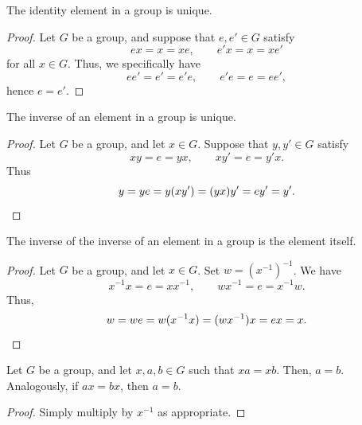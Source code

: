 \documentclass[11pt]{article}
\theoremstyle{definition}
\theoremstyle{remark}
\numberwithin{equation}{section}
\begin{document}
    \begin{lemma}
        The identity element in a group is unique.
    \end{lemma}
    \begin{proof}
        Let $G$ be a group, and suppose that $e, e' \in G$ satisfy \[
            ex = x = xe, \qquad e'x = x = xe'
        \] for all $x \in G$. Thus, we specifically have \[
            ee' = e' = e'e, \qquad e'e = e = ee',
        \] hence $e = e'$.
    \end{proof}

    \begin{lemma}
        The inverse of an element in a group is unique.
    \end{lemma}
    \begin{proof}
        Let $G$ be a group, and let $x \in G$. Suppose that $y, y' \in G$ satisfy \[
            xy = e = yx, \qquad xy' = e = y'x.
        \] Thus \[
            y = ye = y(xy') = (yx)y' = ey' = y'. \qedhere
        \] 
    \end{proof}

    \begin{lemma}
        The inverse of the inverse of an element in a group is the element itself.
    \end{lemma}
    \begin{proof}
        Let $G$ be a group, and let $x \in G$. Set $w = (x^{-1})^{-1}$. We have \[
            x^{-1}x = e = x x^{-1}, \qquad wx^{-1} = e = x^{-1}w.
        \] Thus, \[
            w = we = w(x^{-1}x) = (wx^{-1})x = ex = x. \qedhere
        \] 
    \end{proof}

    \begin{lemma}
        Let $G$ be a group, and let $x, a, b \in G$ such that $xa = xb$. Then, $a =
        b$. Analogously, if $ax = bx$, then $a = b$.
    \end{lemma}
    \begin{proof}
        Simply multiply by $x^{-1}$ as appropriate.
    \end{proof}
    
\end{document}
